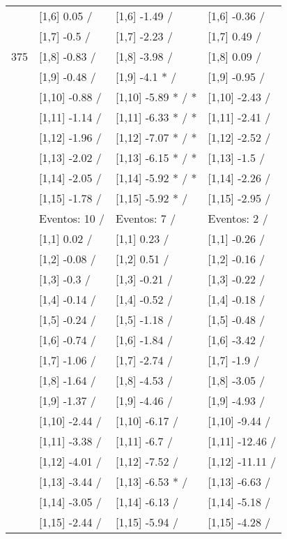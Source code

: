 \begin{table}
\begin{tabular}[t]{llll}
 & {}[1,6] 0.05  / & {}[1,6] -1.49  / & {}[1,6] -0.36  /\\
 & {}[1,7] -0.5  / & {}[1,7] -2.23  / & {}[1,7] 0.49  /\\
375 & {}[1,8] -0.83  / & {}[1,8] -3.98  / & {}[1,8] 0.09  /\\
\addlinespace
 & {}[1,9] -0.48  / & {}[1,9] -4.1 * / & {}[1,9] -0.95  /\\
 & {}[1,10] -0.88  / & {}[1,10] -5.89 * / * & {}[1,10] -2.43  /\\
 & {}[1,11] -1.14  / & {}[1,11] -6.33 * / * & {}[1,11] -2.41  /\\
 & {}[1,12] -1.96  / & {}[1,12] -7.07 * / * & {}[1,12] -2.52  /\\
 & {}[1,13] -2.02  / & {}[1,13] -6.15 * / * & {}[1,13] -1.5  /\\
\addlinespace
 & {}[1,14] -2.05  / & {}[1,14] -5.92 * / * & {}[1,14] -2.26  /\\
 & {}[1,15] -1.78  / & {}[1,15] -5.92 * / & {}[1,15] -2.95  /\\
 & Eventos:  10 / & Eventos:  7 / & Eventos:  2 /\\
 & {}[1,1] 0.02  / & {}[1,1] 0.23  / & {}[1,1] -0.26  /\\
 & {}[1,2] -0.08  / & {}[1,2] 0.51  / & {}[1,2] -0.16  /\\
\addlinespace
 & {}[1,3] -0.3  / & {}[1,3] -0.21  / & {}[1,3] -0.22  /\\
 & {}[1,4] -0.14  / & {}[1,4] -0.52  / & {}[1,4] -0.18  /\\
 & {}[1,5] -0.24  / & {}[1,5] -1.18  / & {}[1,5] -0.48  /\\
 & {}[1,6] -0.74  / & {}[1,6] -1.84  / & {}[1,6] -3.42  /\\
 & {}[1,7] -1.06  / & {}[1,7] -2.74  / & {}[1,7] -1.9  /\\
\addlinespace
500 & {}[1,8] -1.64  / & {}[1,8] -4.53  / & {}[1,8] -3.05  /\\
 & {}[1,9] -1.37  / & {}[1,9] -4.46  / & {}[1,9] -4.93  /\\
 & {}[1,10] -2.44  / & {}[1,10] -6.17  / & {}[1,10] -9.44  /\\
 & {}[1,11] -3.38  / & {}[1,11] -6.7  / & {}[1,11] -12.46  /\\
 & {}[1,12] -4.01  / & {}[1,12] -7.52  / & {}[1,12] -11.11  /\\
\addlinespace
 & {}[1,13] -3.44  / & {}[1,13] -6.53 * / & {}[1,13] -6.63  /\\
 & {}[1,14] -3.05  / & {}[1,14] -6.13  / & {}[1,14] -5.18  /\\
 & {}[1,15] -2.44  / & {}[1,15] -5.94  / & {}[1,15] -4.28  /\\
\bottomrule
\end{tabular}
\end{table}
